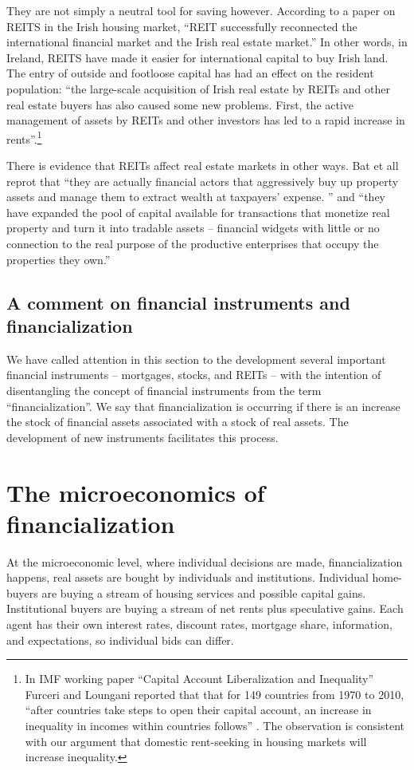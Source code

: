 They are not simply a neutral tool for saving however. According to a paper \cite{wangAnalyzeImpactREITs2021} on REITS in the Irish housing market, ``REIT successfully reconnected the international financial market and the Irish real estate market.'' In other words, in Ireland, REITS have made it easier for international capital to buy Irish land. The entry of outside and footloose capital has had an effect on the resident population:  ``the large-scale acquisition of Irish real estate by REITs and other real estate buyers has also caused some new problems. First, the active management of assets by REITs and other investors has led to a rapid increase in rents''.\footnote{In  IMF working paper ``Capital Account Liberalization and Inequality'' \cite{furceriCapitalAccountLiberalization2015}  Furceri and Loungani reported that that for 149 countries from 1970 to 2010, ``after countries take steps to open their capital account, an increase in inequality in incomes within countries follows'' . The observation is consistent with our argument  that domestic rent-seeking in housing markets will increase inequality.}   

There is evidence that REITs affect real estate markets in other ways. Bat et all  \cite{batRolePublicREITs2022} reprot that  ``they are actually financial actors that aggressively buy up property assets and manage them to extract wealth at taxpayers’ expense. '' and ``they have expanded the pool of capital available for transactions that monetize real property and turn it into tradable assets – financial widgets with little or no connection to the real purpose of the productive enterprises that occupy the properties they own.''

\subsection{A comment on financial instruments and financialization}
We have called attention in this section to the development  several important financial instruments -- mortgages, stocks, and REITs --  with the intention of  disentangling the concept of financial instruments from the term ``financialization''.  We say that financialization is occurring if there is an increase the stock of financial assets associated with a stock of real assets. The development of new instruments facilitates this process. 

\section{The microeconomics of  financialization}\label{section-micro}
At  the microeconomic level, where individual decisions are made, financialization happens,  real assets are bought by individuals and institutions. Individual home-buyers are buying a stream of housing services and possible capital gains. Institutional buyers are buying a stream of net rents plus speculative gains. Each agent has their own interest rates, discount rates, mortgage share, information, and expectations, so individual bids can differ.

